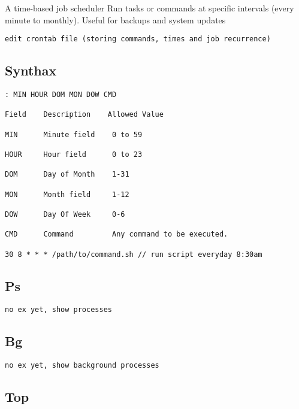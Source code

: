 A time-based job scheduler 
Run tasks or commands at specific intervals (every minute to monthly). 
Useful for backups and system updates 

\begin{verbatim}
edit crontab file (storing commands, times and job recurrence)
\end{verbatim}

\subsection{Synthax}

\begin{verbatim}
: MIN HOUR DOM MON DOW CMD

Field    Description    Allowed Value

MIN      Minute field    0 to 59

HOUR     Hour field      0 to 23

DOM      Day of Month    1-31

MON      Month field     1-12

DOW      Day Of Week     0-6

CMD      Command         Any command to be executed.

30 8 * * * /path/to/command.sh // run script everyday 8:30am
\end{verbatim}

\subsection{Ps}

\begin{verbatim}
no ex yet, show processes
\end{verbatim}

\subsection{Bg}

\begin{verbatim}
no ex yet, show background processes
\end{verbatim}

\subsection{Top}

